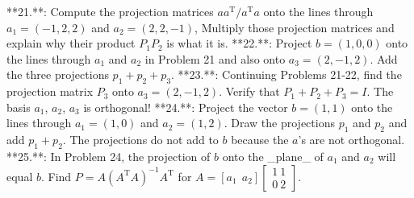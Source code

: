 **21.**: Compute the projection matrices \(aa^{\mathrm{T}}/a^{\mathrm{T}}a\) onto the lines through \(a_{1}=(-1,2,2)\) and \(a_{2}=(2,2,-1)\), Multiply those projection matrices and explain why their product \(P_{1}P_{2}\) is what it is.
**22.**: Project \(b=(1,0,0)\) onto the lines through \(a_{1}\) and \(a_{2}\) in Problem 21 and also onto \(a_{3}=(2,-1,2)\). Add the three projections \(p_{1}+p_{2}+p_{3}\).
**23.**: Continuing Problems 21-22, find the projection matrix \(P_{3}\) onto \(a_{3}=(2,-1,2)\). Verify that \(P_{1}+P_{2}+P_{3}=I\). The basis \(a_{1}\), \(a_{2}\), \(a_{3}\) is orthogonal!
**24.**: Project the vector \(b=(1,1)\) onto the lines through \(a_{1}=(1,0)\) and \(a_{2}=(1,2)\). Draw the projections \(p_{1}\) and \(p_{2}\) and add \(p_{1}+p_{2}\). The projections do not add to \(b\) because the \(a\)'s are not orthogonal.
**25.**: In Problem 24, the projection of \(b\) onto the _plane_ of \(a_{1}\) and \(a_{2}\) will equal \(b\). Find \(P=A(A^{\mathrm{T}}A)^{-1}A^{\mathrm{T}}\) for \(A=[a_{1}\ \ a_{2}]\begin{bmatrix}1\ 1\\ 0\ 2\end{bmatrix}\).

 